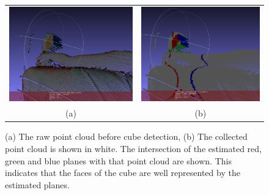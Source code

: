 \documentclass{llncs}
\begin{document}
\begin{figure}
\centering
\begin{tabular}{cc}
\centering
\includegraphics[scale=.233]{linesNotFound} &
\includegraphics[scale=.233]{linesPointcloud}\\
(a) & (b)
\end{tabular}

\caption{
(a) The raw point cloud before cube detection, (b) The collected point cloud is shown in white. The intersection of the estimated red, green and blue planes with that point cloud are shown. This indicates that the faces of the cube are well represented by the estimated planes.
}
\end{figure}
\end{document}
